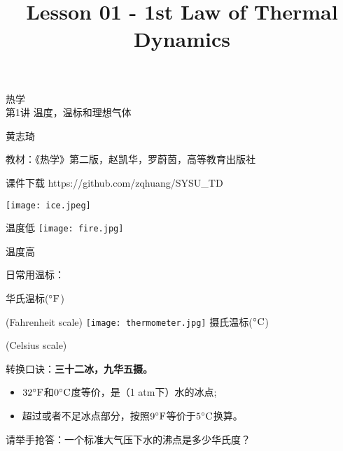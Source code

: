 \documentclass[CJK]{beamer}
\title{Lesson 01 - 1st Law of Thermal Dynamics}
\author{}
\date{}
\begin{document}
\begin{frame}
\begin{center}
\begin{Large}
\bch
热学 \\
第1讲 温度，温标和理想气体

{\vskip 0.3in}

黄志琦

\ech
\end{Large}
\end{center}

\vskip 0.2in

\bch
教材：《热学》第二版，赵凯华，罗蔚茵，高等教育出版社
\ech

\bch
课件下载
\ech
https://github.com/zqhuang/SYSU\_TD
\end{frame}


\begin{frame}
\bch
{\large 

\skiplines

\texttt{[image: ice.jpeg]}

温度低
\emini
{}
\texttt{[image: fire.jpg]}

温度高
\emini
}
\ech
\end{frame}


\begin{frame}
\bch

日常用温标：
\skiplines

华氏温标(${^\circ \mathrm{F}}$)

(Fahrenheit scale)
\emini
{}
\texttt{[image: thermometer.jpg]}
\emini
{}
摄氏温标($^\circ \mathrm{C}$)

(Celsius scale)
\emini

\ech
\end{frame}


\begin{frame}
\bch
\skipline
转换口诀：{\bf 三十二冰，九华五摄。}
\begin{itemize}
\item{$32{^\circ \mathrm{F}}$和$0^\circ \mathrm{C}$度等价，是（1 atm下）水的冰点;}
\item{超过或者不足冰点部分，按照$9{^\circ \mathrm{F}}$等价于$5^\circ \mathrm{C}$换算。}
\end{itemize}

\skiplines

请举手抢答：一个标准大气压下水的沸点是多少华氏度？
\ech
\end{frame}
\end{document}
